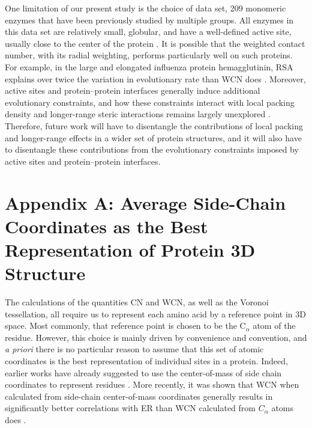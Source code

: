 \documentclass[12pt]{article}
\begin{document}
One limitation of our present study is the choice of data set, 209 monomeric enzymes that have been previously studied by multiple groups. All enzymes in this data set are relatively small, globular, and have a well-defined active site, usually close to the center of the protein \cite{shih_evolutionary_2012}. It is possible that the weighted contact number, with its radial weighting, performs particularly well on such proteins. For example, in the large and elongated influenza protein hemagglutinin, RSA explains over twice the variation in evolutionary rate than WCN does  \cite{meyer_geometric_2015}. Moreover, active sites and protein--protein interfaces generally induce additional evolutionary constraints, and how these constraints interact with local packing density and longer-range steric interactions remains largely unexplored \cite{Deanetal2002, franzosa_structural_2009, meyer_geometric_2015,Abriataetal2015}. Therefore, future work will have to disentangle the contributions of local packing and longer-range effects in a wider set of protein structures, and it will also have to disentangle these contributions from the evolutionary constraints imposed by active sites and protein--protein interfaces.
    
\section*{Appendix A: Average Side-Chain Coordinates as the Best Representation of Protein 3D Structure}
\label{app:best_crd}

The calculations of the quantities CN and WCN, as well as the Voronoi tessellation, all require us to represent each amino acid by a reference point in 3D space. Most commonly, that reference point is chosen to be the C$_\alpha$ atom of the residue. However, this choice is mainly driven by convenience and convention, and \emph{a priori} there is no particular reason to assume that this set of atomic coordinates is the best representation of individual sites in a protein. Indeed, earlier works have already suggested to use the center-of-mass of side chain coordinates to represent residues \cite{soyer_voronoi_2000}. More recently, it was shown that WCN when calculated from side-chain center-of-mass coordinates generally results in significantly better correlations with ER than WCN calculated from $C_\alpha$ atoms does \cite{marcos_too_2015}.
    
\end{document}
